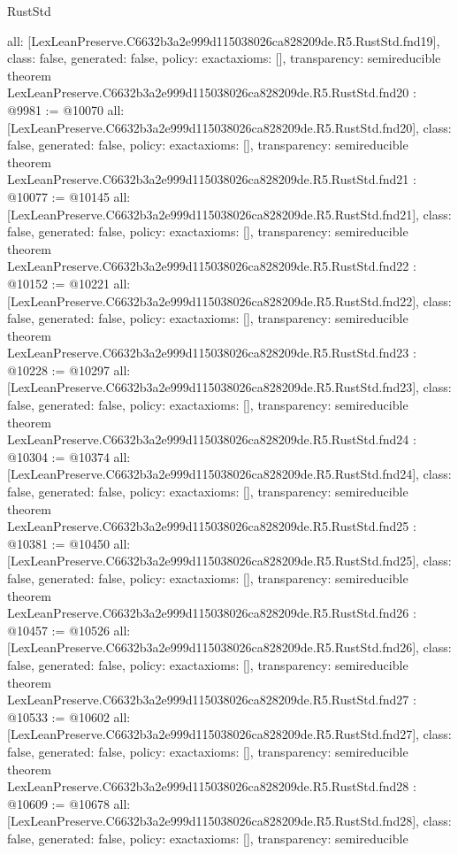 \begin{lexlean}{RustStd}
\begin{coremodule}
{  all: [LexLeanPreserve.C6632b3a2e999d115038026ca828209de.R5.RustStd.fnd19],
  class: false,
  generated: false,
  policy: exact{axioms: []},
  transparency: semireducible
}
theorem LexLeanPreserve.C6632b3a2e999d115038026ca828209de.R5.RustStd.fnd20 : @9981 := @10070 {
  all: [LexLeanPreserve.C6632b3a2e999d115038026ca828209de.R5.RustStd.fnd20],
  class: false,
  generated: false,
  policy: exact{axioms: []},
  transparency: semireducible
}
theorem LexLeanPreserve.C6632b3a2e999d115038026ca828209de.R5.RustStd.fnd21 : @10077 := @10145 {
  all: [LexLeanPreserve.C6632b3a2e999d115038026ca828209de.R5.RustStd.fnd21],
  class: false,
  generated: false,
  policy: exact{axioms: []},
  transparency: semireducible
}
theorem LexLeanPreserve.C6632b3a2e999d115038026ca828209de.R5.RustStd.fnd22 : @10152 := @10221 {
  all: [LexLeanPreserve.C6632b3a2e999d115038026ca828209de.R5.RustStd.fnd22],
  class: false,
  generated: false,
  policy: exact{axioms: []},
  transparency: semireducible
}
theorem LexLeanPreserve.C6632b3a2e999d115038026ca828209de.R5.RustStd.fnd23 : @10228 := @10297 {
  all: [LexLeanPreserve.C6632b3a2e999d115038026ca828209de.R5.RustStd.fnd23],
  class: false,
  generated: false,
  policy: exact{axioms: []},
  transparency: semireducible
}
theorem LexLeanPreserve.C6632b3a2e999d115038026ca828209de.R5.RustStd.fnd24 : @10304 := @10374 {
  all: [LexLeanPreserve.C6632b3a2e999d115038026ca828209de.R5.RustStd.fnd24],
  class: false,
  generated: false,
  policy: exact{axioms: []},
  transparency: semireducible
}
theorem LexLeanPreserve.C6632b3a2e999d115038026ca828209de.R5.RustStd.fnd25 : @10381 := @10450 {
  all: [LexLeanPreserve.C6632b3a2e999d115038026ca828209de.R5.RustStd.fnd25],
  class: false,
  generated: false,
  policy: exact{axioms: []},
  transparency: semireducible
}
theorem LexLeanPreserve.C6632b3a2e999d115038026ca828209de.R5.RustStd.fnd26 : @10457 := @10526 {
  all: [LexLeanPreserve.C6632b3a2e999d115038026ca828209de.R5.RustStd.fnd26],
  class: false,
  generated: false,
  policy: exact{axioms: []},
  transparency: semireducible
}
theorem LexLeanPreserve.C6632b3a2e999d115038026ca828209de.R5.RustStd.fnd27 : @10533 := @10602 {
  all: [LexLeanPreserve.C6632b3a2e999d115038026ca828209de.R5.RustStd.fnd27],
  class: false,
  generated: false,
  policy: exact{axioms: []},
  transparency: semireducible
}
theorem LexLeanPreserve.C6632b3a2e999d115038026ca828209de.R5.RustStd.fnd28 : @10609 := @10678 {
  all: [LexLeanPreserve.C6632b3a2e999d115038026ca828209de.R5.RustStd.fnd28],
  class: false,
  generated: false,
  policy: exact{axioms: []},
  transparency: semireducible
}
\end{coremodule}
\end{lexlean}
